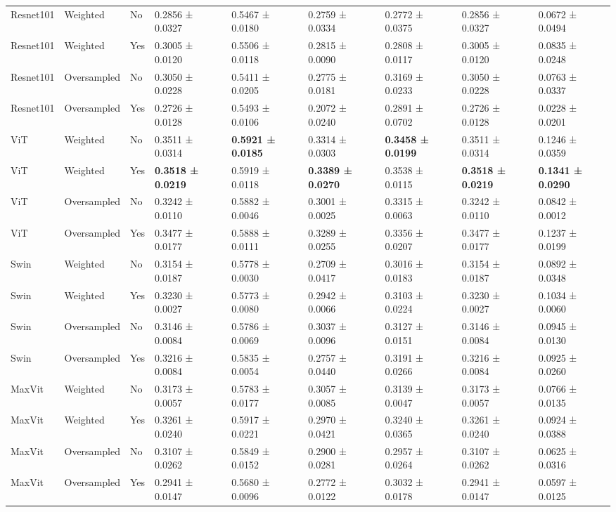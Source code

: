 \documentclass[a4paper,10pt]{book}
\begin{document}
\begin{scriptsize}
\begin{longtable}{@{}l l p{0.5cm} p{1.2cm} p{1.2cm} p{1.2cm} p{1.2cm} p{1.2cm} p{1.2cm}@{}}
\bottomrule
\endlastfoot
Resnet101 & Weighted & No & 0.2856 ± 0.0327 & 0.5467 ± 0.0180 & 0.2759 ± 0.0334 & 0.2772 ± 0.0375 & 0.2856 ± 0.0327 & 0.0672 ± 0.0494 \\ 
        Resnet101 & Weighted & Yes & 0.3005 ± 0.0120 & 0.5506 ± 0.0118 & 0.2815 ± 0.0090 & 0.2808 ± 0.0117 & 0.3005 ± 0.0120 & 0.0835 ± 0.0248 \\ 
        Resnet101 & Oversampled & No & 0.3050 ± 0.0228 & 0.5411 ± 0.0205 & 0.2775 ± 0.0181 & 0.3169 ± 0.0233 & 0.3050 ± 0.0228 & 0.0763 ± 0.0337 \\ 
        Resnet101 & Oversampled & Yes & 0.2726 ± 0.0128 & 0.5493 ± 0.0106 & 0.2072 ± 0.0240 & 0.2891 ± 0.0702 & 0.2726 ± 0.0128 & 0.0228 ± 0.0201 \\ 
        ViT & Weighted & No & 0.3511 ± 0.0314 & \textbf{0.5921 ± 0.0185} & 0.3314 ± 0.0303 & \textbf{0.3458 ± 0.0199} & 0.3511 ± 0.0314 & 0.1246 ± 0.0359 \\ 
        ViT & Weighted & Yes &\textbf{0.3518 ± 0.0219} & 0.5919 ± 0.0118 & \textbf{0.3389 ± 0.0270} & 0.3538 ± 0.0115 & \textbf{0.3518 ± 0.0219} & \textbf{0.1341 ± 0.0290} \\ 
        ViT & Oversampled & No & 0.3242 ± 0.0110 & 0.5882 ± 0.0046 & 0.3001 ± 0.0025 & 0.3315 ± 0.0063 & 0.3242 ± 0.0110 & 0.0842 ± 0.0012 \\ 
        ViT & Oversampled & Yes & 0.3477 ± 0.0177 & 0.5888 ± 0.0111 & 0.3289 ± 0.0255 & 0.3356 ± 0.0207 & 0.3477 ± 0.0177 & 0.1237 ± 0.0199 \\ 
        Swin & Weighted & No & 0.3154 ± 0.0187 & 0.5778 ± 0.0030 & 0.2709 ± 0.0417 & 0.3016 ± 0.0183 & 0.3154 ± 0.0187 & 0.0892 ± 0.0348 \\ 
        Swin & Weighted & Yes & 0.3230 ± 0.0027 & 0.5773 ± 0.0080 & 0.2942 ± 0.0066 & 0.3103 ± 0.0224 & 0.3230 ± 0.0027 & 0.1034 ± 0.0060 \\ 
        Swin & Oversampled & No & 0.3146 ± 0.0084 & 0.5786 ± 0.0069 & 0.3037 ± 0.0096 & 0.3127 ± 0.0151 & 0.3146 ± 0.0084 & 0.0945 ± 0.0130 \\ 
        Swin & Oversampled & Yes & 0.3216 ± 0.0084 & 0.5835 ± 0.0054 & 0.2757 ± 0.0440 & 0.3191 ± 0.0266 & 0.3216 ± 0.0084 & 0.0925 ± 0.0260 \\ 
        MaxVit & Weighted & No & 0.3173 ± 0.0057 & 0.5783 ± 0.0177 & 0.3057 ± 0.0085 & 0.3139 ± 0.0047 & 0.3173 ± 0.0057 & 0.0766 ± 0.0135 \\ 
        MaxVit & Weighted & Yes & 0.3261 ± 0.0240 & 0.5917 ± 0.0221 & 0.2970 ± 0.0421 & 0.3240 ± 0.0365 & 0.3261 ± 0.0240 & 0.0924 ± 0.0388 \\ 
        MaxVit & Oversampled & No & 0.3107 ± 0.0262 & 0.5849 ± 0.0152 & 0.2900 ± 0.0281 & 0.2957 ± 0.0264 & 0.3107 ± 0.0262 & 0.0625 ± 0.0316 \\ 
        MaxVit & Oversampled & Yes & 0.2941 ± 0.0147 & 0.5680 ± 0.0096 & 0.2772 ± 0.0122 & 0.3032 ± 0.0178 & 0.2941 ± 0.0147 & 0.0597 ± 0.0125 \\   
\end{longtable}
\end{scriptsize}
\end{document}
